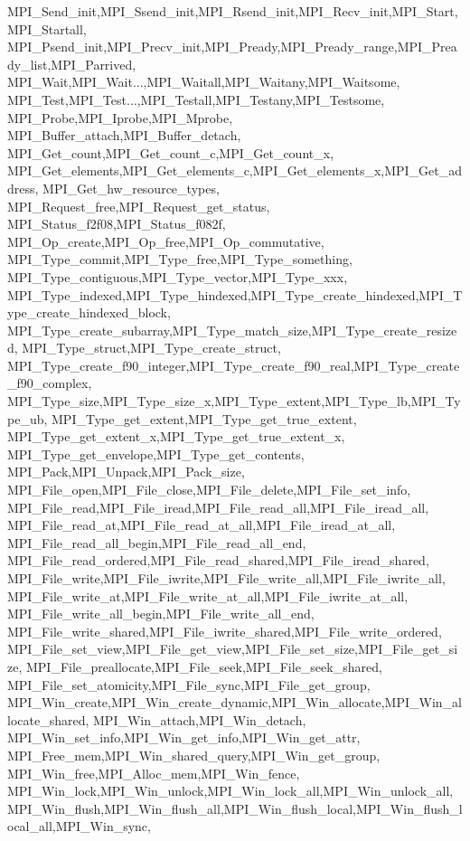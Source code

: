 {{{{{    MPI_Send_init,MPI_Ssend_init,MPI_Rsend_init,MPI_Recv_init,MPI_Start,MPI_Startall,
    MPI_Psend_init,MPI_Precv_init,MPI_Pready,MPI_Pready_range,MPI_Pready_list,MPI_Parrived,
    MPI_Wait,MPI_Wait...,MPI_Waitall,MPI_Waitany,MPI_Waitsome,
    MPI_Test,MPI_Test...,MPI_Testall,MPI_Testany,MPI_Testsome,
    MPI_Probe,MPI_Iprobe,MPI_Mprobe,
    MPI_Buffer_attach,MPI_Buffer_detach,
    MPI_Get_count,MPI_Get_count_c,MPI_Get_count_x,
    MPI_Get_elements,MPI_Get_elements_c,MPI_Get_elements_x,MPI_Get_address,
    MPI_Get_hw_resource_types,
    MPI_Request_free,MPI_Request_get_status,
    MPI_Status_f2f08,MPI_Status_f082f,
    MPI_Op_create,MPI_Op_free,MPI_Op_commutative,
    MPI_Type_commit,MPI_Type_free,MPI_Type_something,
    MPI_Type_contiguous,MPI_Type_vector,MPI_Type_xxx,
    MPI_Type_indexed,MPI_Type_hindexed,MPI_Type_create_hindexed,MPI_Type_create_hindexed_block,
    MPI_Type_create_subarray,MPI_Type_match_size,MPI_Type_create_resized,
    MPI_Type_struct,MPI_Type_create_struct,
    MPI_Type_create_f90_integer,MPI_Type_create_f90_real,MPI_Type_create_f90_complex,
    MPI_Type_size,MPI_Type_size_x,MPI_Type_extent,MPI_Type_lb,MPI_Type_ub,
    MPI_Type_get_extent,MPI_Type_get_true_extent,
    MPI_Type_get_extent_x,MPI_Type_get_true_extent_x,
    MPI_Type_get_envelope,MPI_Type_get_contents,
    MPI_Pack,MPI_Unpack,MPI_Pack_size,
    MPI_File_open,MPI_File_close,MPI_File_delete,MPI_File_set_info,
    MPI_File_read,MPI_File_iread,MPI_File_read_all,MPI_File_iread_all,
    MPI_File_read_at,MPI_File_read_at_all,MPI_File_iread_at_all,
    MPI_File_read_all_begin,MPI_File_read_all_end,
    MPI_File_read_ordered,MPI_File_read_shared,MPI_File_iread_shared,
    MPI_File_write,MPI_File_iwrite,MPI_File_write_all,MPI_File_iwrite_all,
    MPI_File_write_at,MPI_File_write_at_all,MPI_File_iwrite_at_all,
    MPI_File_write_all_begin,MPI_File_write_all_end,
    MPI_File_write_shared,MPI_File_iwrite_shared,MPI_File_write_ordered,
    MPI_File_set_view,MPI_File_get_view,MPI_File_set_size,MPI_File_get_size,
    MPI_File_preallocate,MPI_File_seek,MPI_File_seek_shared,
    MPI_File_set_atomicity,MPI_File_sync,MPI_File_get_group,
    MPI_Win_create,MPI_Win_create_dynamic,MPI_Win_allocate,MPI_Win_allocate_shared,
    MPI_Win_attach,MPI_Win_detach,
    MPI_Win_set_info,MPI_Win_get_info,MPI_Win_get_attr,
    MPI_Free_mem,MPI_Win_shared_query,MPI_Win_get_group,
    MPI_Win_free,MPI_Alloc_mem,MPI_Win_fence,
    MPI_Win_lock,MPI_Win_unlock,MPI_Win_lock_all,MPI_Win_unlock_all,
    MPI_Win_flush,MPI_Win_flush_all,MPI_Win_flush_local,MPI_Win_flush_local_all,MPI_Win_sync,
}}}}}
